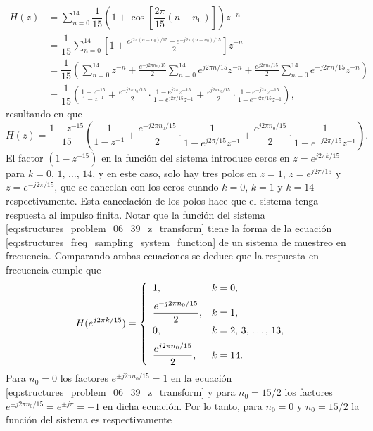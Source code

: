 \documentclass[a4paper]{report}
\begin{document}
\begin{align*}
 H(z)&=\sum_{n=0}^{14}\dfrac{1}{15}\left(1+\cos\left[\dfrac{2\pi}{15}(n-n_0)\right]\right)z^{-n}\\
  &=\dfrac{1}{15}\sum_{n=0}^{14}\left[1+\frac{e^{j2\pi(n-n_0)/15}+e^{-j2\pi(n-n_0)/15}}{2}\right]z^{-n}\\
  &=\dfrac{1}{15}\left(\sum_{n=0}^{14}z^{-n}+\frac{e^{-j2\pi n_0/15}}{2}\sum_{n=0}^{14}e^{j2\pi n/15}z^{-n}
   +\frac{e^{j2\pi n_0/15}}{2}\sum_{n=0}^{14}e^{-j2\pi n/15}z^{-n}\right)\\
  &=\dfrac{1}{15}\left(\frac{1-z^{-15}}{1-z^{-1}}
   +\frac{e^{-j2\pi n_0/15}}{2}\cdot\frac{1-e^{j2\pi}z^{-15}}{1-e^{j2\pi/15}z^{-1}}
   +\frac{e^{j2\pi n_0/15}}{2}\cdot\frac{1-e^{-j2\pi}z^{-15}}{1-e^{-j2\pi/15}z^{-1}}\right), 
\end{align*}
resultando en que 
\begin{equation}\label{eq:structures_problem_06_39_z_transform}
 H(z)=\dfrac{1-z^{-15}}{15}\left(\frac{1}{1-z^{-1}}
   +\frac{e^{-j2\pi n_0/15}}{2}\cdot\frac{1}{1-e^{j2\pi/15}z^{-1}}
   +\frac{e^{j2\pi n_0/15}}{2}\cdot\frac{1}{1-e^{-j2\pi/15}z^{-1}}\right).
\end{equation}
El factor \((1-z^{-15})\)  en la función del sistema introduce ceros en \(z=e^{j2\pi k/15}\) para \(k=0,\,1,\,\dots,\,14\), y en este caso, solo hay tres polos en \(z=1\), \(z=e^{j2\pi/15}\) y \(z=e^{-j2\pi/15}\), que se cancelan con los ceros cuando \(k=0\), \(k=1\) y \(k=14\) respectivamente. Esta cancelación de los polos hace que el sistema tenga respuesta al impulso finita. Notar que la función del sistema \ref{eq:structures_problem_06_39_z_transform} tiene la forma de la ecuación \ref{eq:structures_freq_sampling_system_function} de un sistema de muestreo en frecuencia. Comparando ambas ecuaciones se deduce que la respuesta en frecuencia cumple que 
\[
 H(e^{j2\pi k/15})=
 \left\{ 
 \begin{array}{ll}
  1,& k=0,\\[\medskipamount]
  \dfrac{e^{-j2\pi n_0/15}}{2}, &k=1,\\[\medskipamount]
  0, & k=2,\,3,\,\dots,\,13,\\[\medskipamount]
  \dfrac{e^{j2\pi n_0/15}}{2}, &k=14.
 \end{array}
 \right.
\]
Para \(n_0=0\) los factores \(e^{\pm j2\pi n_0/15}=1\) en la ecuación \ref{eq:structures_problem_06_39_z_transform} y para \(n_0=15/2\) los factores \(e^{\pm j2\pi n_0/15}=e^{\pm j\pi}=-1\) en dicha ecuación. Por lo tanto, para \(n_0=0\) y \(n_0=15/2\) la función del sistema es respectivamente
\end{document}
